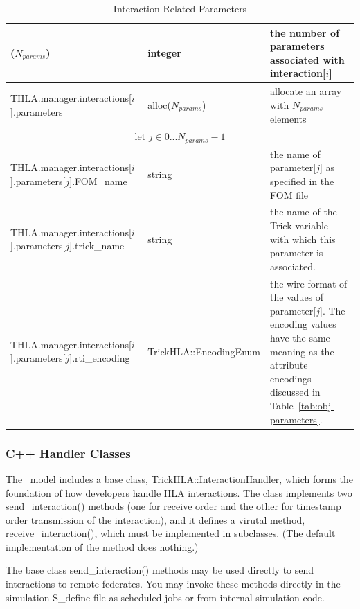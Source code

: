 \begin{table}[hb]
\begin{center}
\begin{tabular}{|p{2in}|l|p{3.25in}|}
      ($N_{params}$)
      & integer
      & the number of parameters associated with interaction[$i$]
      \\
      \hline
      {\ttfamily THLA.manager.\-interactions[$i$].parameters}
      & alloc($N_{params}$)
      & allocate an array with $N_{params}$ elements
      \\
      \hline
      \hline
      \multicolumn{3}{|c|}{
        \rule[-3mm]{0mm}{7mm}
        let $j \in 0...N_{params}-1$
      }
      \\
      \hline
      {\ttfamily
         THLA.manager.\-interactions[$i$].parameters[$j$].\-FOM\_name
      }
      & string
      & the name of parameter[$j$] as specified in the FOM file
      \\
      \hline
      {\ttfamily
         THLA.manager.\-interactions[$i$].parameters[$j$].\-trick\_name
      }
      & string
      & the name of the Trick variable with which this parameter is associated.
      \\
      \hline
      {\ttfamily
         THLA.manager.\-interactions[$i$].parameters[$j$].\-rti\_encoding
      }
      & {\ttfamily TrickHLA::EncodingEnum}
      & the wire format of the values of parameter[$j$].
        The encoding values have the same meaning as the attribute
        encodings discussed in Table~\ref{tab:obj-parameters}.
      \\
      \hline
    \end{tabular}
  \end{center}
  \caption{Interaction-Related Parameters}
  \label{tab:interaction-parameters}
\end{table}

\subsubsection{C++ Handler Classes}

The \TrickHLA\ model includes a base class,
{\ttfamily TrickHLA::InteractionHandler},
which forms the foundation of how developers handle
HLA interactions.
The class implements two {\ttfamily send\_interaction()} methods
(one for receive order and the other for timestamp order transmission
of the interaction),
and it defines a virutal method, {\ttfamily receive\_interaction()},
which must be implemented in subclasses.
(The default implementation of the method does nothing.)

The base class {\ttfamily send\_interaction()} methods may be used
directly to send interactions to remote federates.
You may invoke these methods directly in the simulation
{\ttfamily S\_define} file as scheduled jobs or from internal
simulation code.

